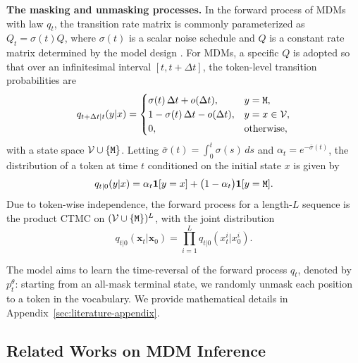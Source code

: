 \textbf{The masking and unmasking processes.} In the forward process of MDMs with law $q_t$, the transition rate matrix is commonly parameterized as $Q_t = \sigma(t)Q$, where $\sigma(t)$ is a scalar noise schedule and $Q$ is a constant rate matrix determined by the model design \citep{campbell2022continuous}. For MDMs, a specific $Q$ is adopted so that over an infinitesimal interval $[t,t+\Delta t]$, the token-level transition probabilities are
\begin{equation*}
    q_{t+\Delta t|t}(y|x)=
\begin{cases}
\sigma(t)\,\Delta t + o(\Delta t), & y=\texttt{M},\\
1-\sigma(t)\,\Delta t - o(\Delta t), & y=x\in\mathcal V,\\
0, & \text{otherwise},
\end{cases}
\end{equation*}
with a state space $\mathcal V\cup\{\texttt{M}\}$. Letting $\bar\sigma(t)=\int_0^t\sigma(s)\,ds$ and $\alpha_t = e^{-\bar\sigma(t)}$, the distribution of a token at time $t$ conditioned on the initial state $x$ is given by
\begin{equation*}
\label{eq:forward_seq}
    q_{t|0}(y|x)
=
\alpha_t\mathbf 1[y=x]
+
\bigl(1-
\alpha_t\bigr)\mathbf 1[y=\texttt{M}].
\end{equation*}
Due to token-wise independence, the forward process for a length-$L$ sequence is the product CTMC on $(\mathcal V\cup\{\texttt{M}\})^L$, with the joint distribution
\begin{equation*}
\label{eq:forward_distribution}
        q_{t|0}(\bm x_t|\bm x_0)=\prod_{i=1}^L q_{t|0}(x_t^i|x_0^i).
\end{equation*}

The model aims to learn the time-reversal of the forward process $q_t$, denoted by $p_t^\theta$: starting from an all-mask terminal state, we randomly unmask each position to a token in the vocabulary. We provide mathematical details in Appendix~\ref{sec:literature-appendix}.


\subsection{Related Works on MDM Inference}\label{subsec:confidence}

